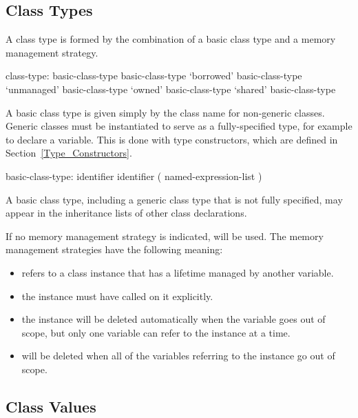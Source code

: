 \subsection{Class Types}
\label{Class_Types}

A class type is formed by the combination of a basic class type and a
memory management strategy.

\begin{syntax}
class-type:
  basic-class-type
  basic-class-type
  `borrowed' basic-class-type
  `unmanaged' basic-class-type
  `owned' basic-class-type
  `shared' basic-class-type
\end{syntax}

A basic class type is given simply by the class name for non-generic classes.
Generic classes must be instantiated to serve as a fully-specified
type, for example to declare a variable.  This is done with
type constructors, which are defined in Section~\ref{Type_Constructors}.

\begin{syntax}
basic-class-type:
  identifier
  identifier ( named-expression-list )
\end{syntax}

A basic class type, including a generic class type that is not
fully specified, may appear in the inheritance lists
of other class declarations.

If no memory management strategy is indicated,  will be
used. The memory management strategies have the following meaning:

\begin{itemize}
  \item {} refers to a class instance that has a lifetime
    managed by another variable.
  \item {} the instance must have  called on it explicitly.
  \item {} the instance will be deleted
    automatically when the  variable goes out of scope, but
    only one  variable can refer to the instance at a time.
  \item {} will be deleted when all of the 
    variables referring to the instance go out of scope.
\end{itemize}


\subsection{Class Values}
\label{Class_Values}

